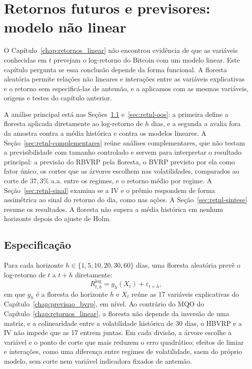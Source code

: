 \chapter{Retornos futuros e previsores: modelo não linear}
\label{chap:retornos_nao_linear}

O Capítulo~\ref{chap:retornos_linear} não encontrou evidência de que as
variáveis conhecidas em $t$ prevejam o log-retorno do Bitcoin com um modelo
linear. Este capítulo pergunta se essa conclusão depende da forma funcional. A
floresta aleatória permite relações não lineares e interações entre as
variáveis explicativas e o retorno sem especificá-las de antemão, e a
aplicamos com as mesmas variáveis, origens e testes do capítulo anterior.

A análise principal está nas Seções~\ref{sec:retnl-especificacao}
e~\ref{sec:retnl-oos}: a primeira define a floresta aplicada diretamente ao
log-retorno de $h$ dias, e a segunda a avalia fora da amostra contra a média
histórica e contra os modelos lineares. A
Seção~\ref{sec:retnl-complementares} reúne análises complementares, que não
testam a previsibilidade com tamanho controlado e servem para interpretar o
resultado principal: a previsão do RBVRP pela floresta, o BVRP previsto por
ela como fator único, os cortes que as árvores escolhem nas volatilidades,
comparados ao corte de $37{,}3\%$ a.a. entre os regimes, e o retorno médio
por regime. A Seção~\ref{sec:retnl-sinal} examina se a IV e o prêmio
respondem de forma assimétrica ao sinal do retorno do dia, como nas ações. A
Seção~\ref{sec:retnl-sintese} resume os resultados. A floresta não supera a
média histórica em nenhum horizonte depois do ajuste de Holm.

\section{Especificação}
\label{sec:retnl-especificacao}

Para cada horizonte $h \in \{1, 5, 10, 20, 30, 60\}$ dias, uma floresta
aleatória prevê o log-retorno de $t$ a $t+h$ diretamente:
\begin{equation}
R^{\log}_{t,h} = g_h(X_t) + \varepsilon_{t+h},
\label{eq:retnl-direto}
\end{equation}
em que $g_h$ é a floresta do horizonte $h$ e $X_t$ reúne as 17 variáveis
explicativas do Capítulo~\ref{chap:previsao_bvrp}, em nível. Ao contrário do
MQO do Capítulo~\ref{chap:retornos_linear}, a floresta não depende da
inversão de uma matriz, e a colinearidade entre a volatilidade histórica de
30 dias, o HBVRP e a IV não impede que as 17 entrem juntas. Em cada divisão, a
árvore escolhe a variável e o ponto de corte que mais reduzem o erro
quadrático; efeitos de limiar e interações, como uma diferença entre regimes
de volatilidade, saem do próprio modelo, sem corte nem variável indicadora
fixados de antemão.

